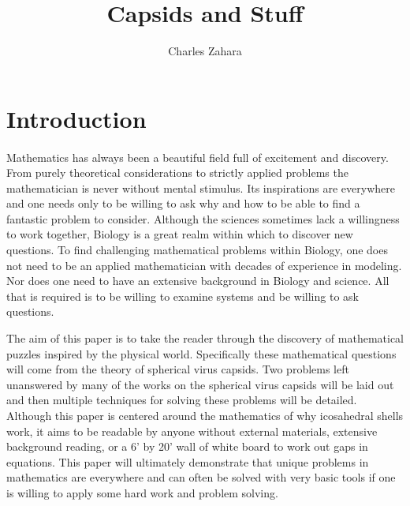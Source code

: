 \documentclass[12pt,letter]{article}
\begin{document}

\title{Capsids and Stuff}
\author{Charles Zahara}
\maketitle

\newpage

\tableofcontents
\newpage
\listoffigures

\newpage

\section{Introduction}


\paragraph{}
Mathematics has always been a beautiful field full of excitement and discovery. From purely theoretical considerations to strictly applied problems the mathematician is never without mental stimulus. Its inspirations are everywhere and one needs only to be willing to ask why and how to be able to find a fantastic problem to consider. Although the sciences sometimes lack a willingness to work together, Biology is a great realm within which to discover new questions. To find challenging mathematical problems within Biology, one does not need to be an applied mathematician with decades of experience in modeling. Nor does one need to have an extensive background in Biology and science. All that is required is to be willing to examine systems and be willing to ask questions.

The aim of this paper is to take the reader through the discovery of mathematical puzzles inspired by the physical world. Specifically these mathematical questions will come from the theory of spherical virus capsids. Two problems left unanswered by many of the works on the spherical virus capsids will be laid out and then multiple techniques for solving these problems will be detailed. Although this paper is centered around the mathematics of why icosahedral shells work, it aims to be readable by anyone without external materials, extensive background reading, or a 6' by 20' wall of white board to work out gaps in equations. This paper will ultimately demonstrate that unique problems in mathematics are everywhere and can often be solved with very basic tools if one is willing to apply some hard work and problem solving.
\end{document}
